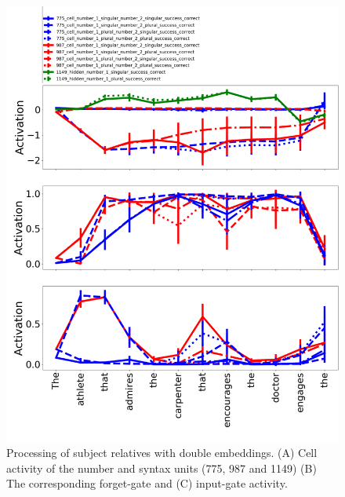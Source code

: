 \begin{figure}[b]
\centering
\includegraphics[width=\linewidth]{Figures/Figure9_doubleRC.png}
\caption{Processing of subject relatives with double embeddings. (A) Cell activity of the number and syntax units (775, 987 and 1149) (B) The corresponding forget-gate and (C) input-gate activity.}
\end{figure}
